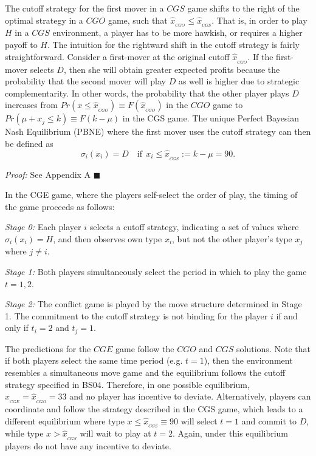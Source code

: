 \documentclass[11pt, letterpaper]{article}
\theoremstyle{plain}
\begin{document}
The cutoff strategy for the first mover in a $CGS$ game shifts to the right of the optimal strategy in a $CGO$ game, such that $\hat{x}_{_{CGO}}\leq\hat{x}_{_{CGS}}$. That is, in order to play $H$ in a $CGS$ environment, a player has to be more hawkish, or requires a higher payoff to $H$. The intuition for the rightward shift in the cutoff strategy is fairly straightforward. Consider a first-mover at the original cutoff $\hat{x}_{_{CGO}}$. If the first-mover selects $D$, then she will obtain greater expected profits because the probability that the second mover will play $D$ as well is higher due to strategic complementarity. In other words, the probability that the other player plays $D$ increases from $Pr(x\leq\hat{x}_{_{CGO}}) \equiv F(\hat{x}_{_{CGO}}) $ in the $CGO$ game to  $Pr(\mu+x_j\leq k) \equiv F(k-\mu)  $ in the CGS game. The unique Perfect Bayesian Nash Equilibrium (PBNE) where the first mover uses the cutoff strategy can then be defined as
\begin{equation}
\sigma_i(x_i)=D \quad \text{if} \ \ x_i\leq \hat{x}_{_{CGS}}:= k-\mu=90. 
\end{equation}

\noindent \textit{Proof:} See Appendix A $\blacksquare$

In the CGE game, where the players self-select the order of play, the timing of the game proceeds as follows:

\textit{Stage 0:} Each player $i$ selects a cutoff strategy, indicating a set of values where $\sigma_i(x_i)=H$, and then observes own type $x_i$, but not the other player's type $x_j$ where $j\neq i$.

 \textit{Stage 1:} Both players simultaneously select the period in which to play the game $t=1,2$. 

\textit{Stage 2:} The conflict game is played by the move structure determined in Stage 1. The commitment to the cutoff strategy is not binding for the player $i$ if and only if $t_i=2$ and $t_j=1$. 

The predictions for the $CGE$ game follow the $CGO$ and $CGS$ solutions. Note that if both players select the same time period (e.g. $t=1$), then the environment resembles a simultaneous move game and the equilibrium follows the cutoff strategy specified in BS04. Therefore, in one possible equilibrium, $\hat{x}_{_{CGE}}=\hat{x}_{_{CGO}}=33$ and no player has incentive to deviate. Alternatively, players can coordinate and follow the strategy described in the CGS game, which leads to a different equilibrium where type $x\leq \hat{x}_{_{CGS}}\equiv 90$ will select $t=1$ and commit to $D$, while type $x>\hat{x}_{_{CGS}}$ will wait to play at $t=2$. Again, under this equilibrium players do not have any incentive to deviate. 
\end{document}
